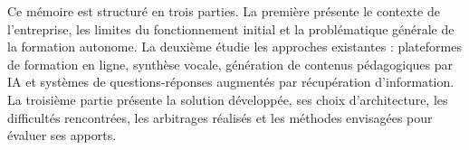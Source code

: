 Ce mémoire est structuré en trois parties. La première présente le contexte de
l'entreprise, les limites du fonctionnement initial et la problématique générale de la
formation autonome. La deuxième étudie les approches existantes : plateformes de
formation en ligne, synthèse vocale, génération de contenus pédagogiques par IA et
systèmes de questions-réponses augmentés par récupération d'information. La troisième
partie présente la solution développée, ses choix d'architecture, les difficultés rencontrées,
les arbitrages réalisés et les méthodes envisagées pour évaluer ses apports.
